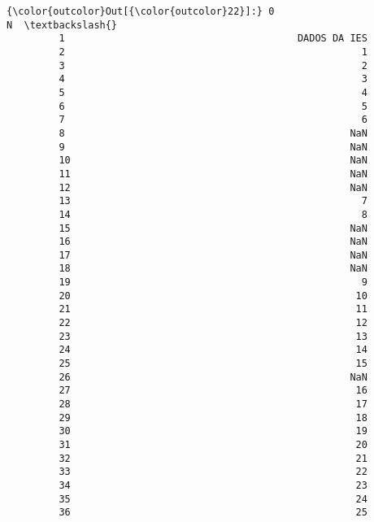 \documentclass[11pt]{article}
\begin{document}
\begin{Verbatim}[commandchars=\\\{\}]
{\color{outcolor}Out[{\color{outcolor}22}]:} 0                                                   N  \textbackslash{}
         1                                        DADOS DA IES   
         2                                                   1   
         3                                                   2   
         4                                                   3   
         5                                                   4   
         6                                                   5   
         7                                                   6   
         8                                                 NaN   
         9                                                 NaN   
         10                                                NaN   
         11                                                NaN   
         12                                                NaN   
         13                                                  7   
         14                                                  8   
         15                                                NaN   
         16                                                NaN   
         17                                                NaN   
         18                                                NaN   
         19                                                  9   
         20                                                 10   
         21                                                 11   
         22                                                 12   
         23                                                 13   
         24                                                 14   
         25                                                 15   
         26                                                NaN   
         27                                                 16   
         28                                                 17   
         29                                                 18   
         30                                                 19   
         31                                                 20   
         32                                                 21   
         33                                                 22   
         34                                                 23   
         35                                                 24   
         36                                                 25   

\end{Verbatim}
\end{document}
